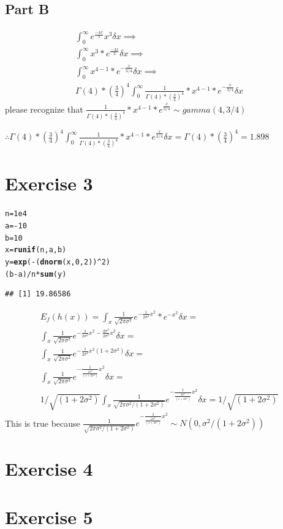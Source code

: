 \documentclass{article}\usepackage[]{graphicx}\usepackage[]{color}
\makeatletter
\newcommand{\hlnum}[1]{\textcolor[rgb]{0.686,0.059,0.569}{#1}}%
\newcommand{\hlopt}[1]{\textcolor[rgb]{0,0,0}{#1}}%
\newcommand{\hlstd}[1]{\textcolor[rgb]{0.345,0.345,0.345}{#1}}%
\newcommand{\hlkwb}[1]{\textcolor[rgb]{0.69,0.353,0.396}{#1}}%
\newcommand{\hlkwd}[1]{\textcolor[rgb]{0.737,0.353,0.396}{\textbf{#1}}}%
\newenvironment{kframe}{%
 \def\at@end@of@kframe{}%
 \ifinner\ifhmode%
  \def\at@end@of@kframe{\end{minipage}}%
  \begin{minipage}{\columnwidth}%
 \fi\fi%
 \def\FrameCommand##1{\hskip\@totalleftmargin \hskip-\fboxsep
 \colorbox{shadecolor}{##1}\hskip-\fboxsep
     \hskip-\linewidth \hskip-\@totalleftmargin \hskip\columnwidth}%
 \MakeFramed {\advance\hsize-\width
   \@totalleftmargin\z@ \linewidth\hsize
   \@setminipage}}%
 {\par\unskip\endMakeFramed%
 \at@end@of@kframe}
\newenvironment{knitrout}{}{} %
\makeatother
\begin{document}
\subsection*{Part B}
\begin{equation}
\begin{split}
\int_{0}^{\infty}e^{\frac{-4x}{3}}x^3\delta x \implies \\
\int_{0}^{\infty}x^3*e^{\frac{-4x}{3}}\delta x \implies \\
\int_{0}^{\infty}x^{4-1}*e^{-\frac{x}{3/4}}\delta x \implies \\
\Gamma(4)*(\frac{3}{4})^4\int_{0}^{\infty}\frac{1}{\Gamma(4)*(\frac{3}{4})^4}*x^{4-1}*e^{-\frac{x}{3/4}}\delta x
\end{split}
\end{equation}
please recognize that $\frac{1}{\Gamma(4)*(\frac{3}{4})^4}*x^{4-1}*e^{\frac{x}{3/4}}\sim gamma(4,3/4)$

$\therefore \Gamma(4)*(\frac{3}{4})^4\int_{0}^{\infty}\frac{1}{\Gamma(4)*(\frac{3}{4})^4}*x^{4-1}*e^{\frac{x}{3/4}}\delta x = \Gamma(4)*(\frac{3}{4})^4 = 1.898$
\section*{Exercise 3}
\begin{knitrout}
\color{fgcolor}\begin{kframe}
\begin{alltt}
\hlstd{n} \hlkwb{=} \hlnum{1e4}
\hlstd{a} \hlkwb{=} \hlopt{-}\hlnum{10}
\hlstd{b} \hlkwb{=} \hlnum{10}
\hlstd{x} \hlkwb{=} \hlkwd{runif}\hlstd{(n, a, b)}
\hlstd{y} \hlkwb{=} \hlkwd{exp}\hlstd{(}\hlopt{-}\hlstd{(}\hlkwd{dnorm}\hlstd{(x,} \hlnum{0}\hlstd{,} \hlnum{2}\hlstd{))}\hlopt{^}\hlnum{2}\hlstd{)}
\hlstd{(b}\hlopt{-}\hlstd{a)}\hlopt{/}\hlstd{n}\hlopt{*}\hlkwd{sum}\hlstd{(y)}
\end{alltt}
\begin{verbatim}
## [1] 19.86586
\end{verbatim}
\end{kframe}
\end{knitrout}
\begin{equation}
\begin{split}
E_{f}(h(x)) = \int_{x}\frac{1}{\sqrt{2\pi\sigma^{2}}}e^{-\frac{1}{2\sigma^2}x^2}*e^{-x^2} \delta x = \\
\int_{x}\frac{1}{\sqrt{2\pi\sigma^{2}}}e^{-\frac{1}{2\sigma^2}x^2 -\frac{2\sigma^2}{2\sigma^2}x^2} \delta x = \\
\int_{x}\frac{1}{\sqrt{2\pi\sigma^{2}}}e^{-\frac{1}{2\sigma^2}x^2(1+2\sigma^2)} \delta x = \\
\int_{x}\frac{1}{\sqrt{2\pi\sigma^{2}}}e^{-\frac{1}{\frac{2\sigma^2}{(1+2\sigma^2)}}x^2} \delta x = \\
1/\sqrt{(1+2\sigma^2)}\int_{x}\frac{1}{\sqrt{2\pi\sigma^{2}/(1+2\sigma^2)}}e^{-\frac{1}{\frac{2\sigma^2}{(1+2\sigma^2)}}x^2} \delta x =
1/\sqrt{(1+2\sigma^2)}
\end{split}
\end{equation}
This is true because $\frac{1}{\sqrt{2\pi\sigma^{2}/(1+2\sigma^2)}}e^{-\frac{1}{\frac{2\sigma^2}{(1+2\sigma^2)}}x^2}\sim N(0, \sigma^2/(1+2\sigma^2))$
\section*{Exercise 4}
\section*{Exercise 5}
\end{document}

